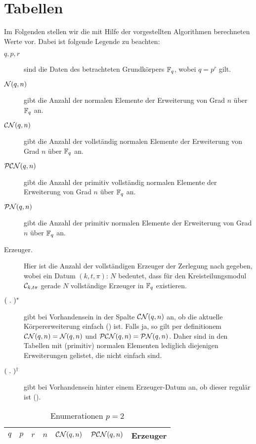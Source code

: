 \chapter{Tabellen}

Im Folgenden stellen wir die mit Hilfe der vorgestellten Algorithmen
berechneten Werte vor. Dabei ist folgende Legende zu beachten:
\begin{description}
  \item[$q, p,r$] sind die Daten des betrachteten Grundkörpers $\F_q$, wobei
    $q = p^r$ gilt.
  \item[$\cal N(q,n)$] gibt die Anzahl der normalen Elemente
    der Erweiterung von Grad $n$ über $\F_q$ an.
  \item[$\CN(q,n)$] gibt die Anzahl der vollständig normalen Elemente
    der Erweiterung von Grad $n$ über $\F_q$ an.
  \item[$\PCN(q,n)$] gibt die Anzahl der primitiv vollständig normalen Elemente 
    der Erweiterung von Grad $n$ über $\F_q$ an.
  \item[$\PN(q,n)$] gibt die Anzahl der primitiv normalen Elemente 
    der Erweiterung von Grad $n$ über $\F_q$ an.
  \item[\normalfont Erzeuger.] Hier ist die Anzahl der vollständigen Erzeuger
    der Zerlegung nach  gegeben, wobei ein Datum
    $(k,t,\pi):\, N$ bedeutet, dass für den Kreisteilungsmodul 
    $\C_{k,t\pi}$ gerade $N$ vollständige Erzeuger in $\F_q$ existieren.
  \item[$(\speq.)^\ast$] gibt bei Vorhandensein in der Spalte $\CN(q,n)$ an, 
    ob die aktuelle Körpererweiterung einfach () ist.
    Falls ja, so gilt per definitionem 
    $\CN(q,n) = \cal N(q,n)$ und $\PCN(q,n) = \PN(q,n)$.
    Daher sind in den Tabellen mit (primitiv) normalen Elementen lediglich
    diejenigen Erweiterungen gelistet, die nicht einfach sind.
  \item[$(\speq.)^\dagger$] gibt bei Vorhandensein hinter einem Erzeuger-Datum
    an, ob dieser regulär ist ().
\end{description}

\begin{longtable}{llllllp{7cm}}
  \caption{Enumerationen $p=2$}\\
  $q$ & $p$ & $r$ & $n$ & $\CN(q,n)$ & $\PCN(q,n)$ & Erzeuger \\\hline
  \endhead
  
\end{longtable}

